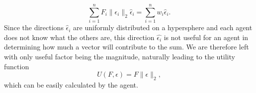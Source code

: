 \begin{equation*}
    \sum^n_{i=1} F_i \|\epsilon_i\|_2 \hat{\epsilon}_i = \sum^n_{i=1} w_i \hat{\epsilon}_i.
\end{equation*}
Since the directions $\hat{\epsilon}_i$ are uniformly distributed on a hypersphere \cite{UnfiormProof} and each agent does not know what the others are, this direction $\hat{\epsilon_i}$ is not useful for an agent in determining how much a vector will contribute to the sum. We are therefore left with only useful factor being the magnitude, naturally leading to the utility function
\begin{equation*}
    U(F,\epsilon) = F \|\epsilon\|_2,
\end{equation*}
which can be easily calculated by the agent.





